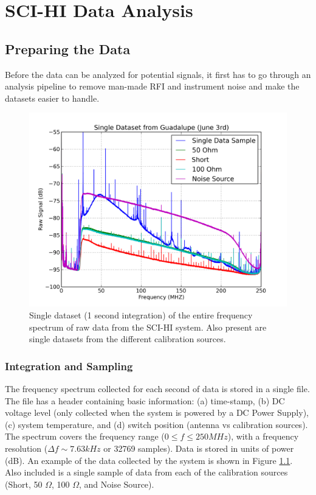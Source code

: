 \chapter{SCI-HI Data Analysis}\label{Ch:Data}



\section{Preparing the Data}

Before the data can be analyzed for potential signals, it first has to go through an analysis pipeline to remove man-made RFI and instrument noise and make the datasets easier to handle. 

\begin{figure}[htb]
\begin{center}
\includegraphics[width=0.88\linewidth]{Data_analysis/figures/single_raw_guad_june03.png}
\caption{Single dataset (1 second integration) of the entire frequency spectrum of raw data from the SCI-HI system. Also present are single datasets from the different calibration sources.}
\label{Fig:raw_data}
\end{center}
\end{figure}


\subsection{Integration and Sampling}\label{Sec:int}

The frequency spectrum collected for each second of data is stored in a single file. The file has a header containing basic information: (a) time-stamp, (b) DC voltage level (only collected when the system is powered by a DC Power Supply), (c) system temperature, and (d) switch position (antenna vs calibration sources). The spectrum covers the frequency range ($0 \leq f \leq 250 MHz$), with a frequency resolution ($\Delta f \sim 7.63 kHz$ or 32769 samples). Data is stored in units of power (dB). An example of the data collected by the system is shown in Figure \ref{Fig:raw_data}. Also included is a single sample of data from each of the calibration sources (Short, 50 $\Omega$, 100 $\Omega$, and Noise Source). 

